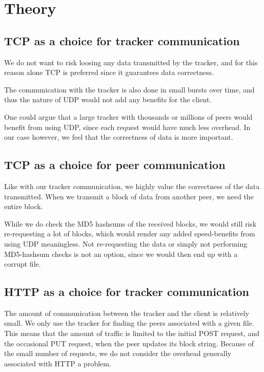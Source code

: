 \documentclass{acm_proc_article-sp}
\begin{document}

\section{Theory}

\subsection{TCP as a choice for tracker communication}
We do not want to risk loosing any data transmitted by the tracker, and for this reason alone TCP is preferred since it guarantees data correctness.

The communication with the tracker is also done in small bursts over time, and thus the nature of UDP would not add any benefits for the client.

One could argue that a large tracker with thousands or millions of peers would benefit from using UDP, since each request would have much less overhead. In our case however, we feel that the correctness of data is more important.

\subsection{TCP as a choice for peer communication}
Like with our tracker communication, we highly value the correctness of the data transmitted. When we transmit a block of data from another peer, we need the entire block. 

While we do check the MD5 hashsums of the received blocks, we would still risk re-requesting a lot of blocks, which would render any added speed-benefits from using UDP meaningless.
Not re-requesting the data or simply not performing MD5-hashsum checks is not an option, since we would then end up with a corrupt file.

\subsection{HTTP as a choice for tracker communication}
The amount of communication between the tracker and the client is relatively small. We only use the tracker for finding the peers associated with a given file. This means that the amount of traffic is limited to the initial POST request, and the occasional PUT request, when the peer updates its block string. Because of the small number of requests, we do not consider the overhead generally associated with HTTP a problem.
\end{document}
